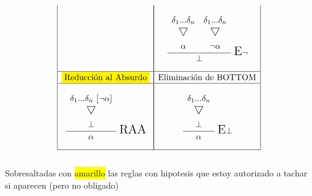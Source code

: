 \documentclass[a4paper,12pt]{article}
\newcommand\triangulo{\scaleobj{1.3}{\bigtriangledown}}
\begin{document}
\begin{equation*}
\begin{array}{|c|c|c|}
\begin{matrix}
  \ 
\end{matrix}
&
\multicolumn{2}{|c|}{
  \begin{matrix}
  \cfrac{
    \begin{matrix}
      \begin{array}{cc}
      \ \\
        \delta_1 ... \delta_n & \delta_1 ... \delta_n \\
        \triangulo & \triangulo \vspace{2mm}\\
        \alpha & \neg \alpha
      \end{array} \\
    \end{matrix}}{\bot}
  \ \text{\Large E}\neg \\
  \ 
\end{matrix}
}
\\ \hline
  \colorbox{yellow}{Reducción al Absurdo} & \multicolumn{2}{|c|}{\text{Eliminación de BOTTOM}}
\\ \hline
\begin{matrix}
  \\
  \cfrac{
    \begin{matrix}
      \begin{array}{c}
        \delta_1 ... \delta_n \ [\neg \alpha]\\
          \triangulo \vspace{2mm}\\
        \bot
      \end{array} \\
    \end{matrix}}{\alpha}
  \ \text{\Large RAA}
  \\
  \ 
\end{matrix}
&
\multicolumn{2}{|c|}{
\begin{matrix}
  \\
  \cfrac{
    \begin{matrix}
      \begin{array}{c}
        \delta_1 ... \delta_n \\
          \triangulo \vspace{2mm}\\
        \bot
      \end{array} \\
    \end{matrix}}{\alpha}
  \ \text{\Large E} \bot
  \\
  \
\end{matrix}
}
\\ \hline
\end{array}
\end{equation*} \\
\small Sobresaltadas con \colorbox{yellow}{amarillo} las reglas con hipotesis que estoy autorizado a tachar si aparecen (pero no obligado)
\end{document}
